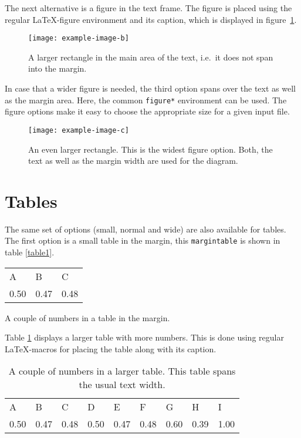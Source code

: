\documentclass{caesar_book}
\begin{document}
The next alternative is a figure in the text frame. The figure is placed using the regular \LaTeX-figure environment and its  caption, which is displayed in figure~\ref{rectangle2}. 
%
\begin{figure}[htbp]%
	\texttt{[image: example-image-b]}%
	\caption{A larger rectangle in the main area of the text, i.e.\ it does not span into the margin.}%
	\label{rectangle2}%
\end{figure}%
%

In case that a wider figure is needed, the third option spans over the text as well as the margin area. Here, the common \texttt{figure*} environment can be used. The figure options make it easy to choose the appropriate size for a given input file. 
%
\begin{figure*}[htbp]
    \texttt{[image: example-image-c]}%
    \caption{An even larger rectangle. This is the widest figure option. Both, the text as well as the margin width are used for the diagram.}
    \label{rectangle3}
\end{figure*}
%

\section{Tables}
The same set of options (small, normal and wide) are also available for tables. The first option is a small table in the margin, this \texttt{margintable} is shown in table \ref{table1}.
%
\begin{margintable}%
	\begin{tabular}{lll}%
     A&B&C\\%
     0.50&0.47&0.48\\%
    \end{tabular}%
	\vspace{2pt}
	\caption{A couple of numbers in a table in the margin.\label{table1}}%
\end{margintable}%

Table \ref{table2} displays a larger table with more numbers. This is done using regular \LaTeX-macros for placing the table along with its caption. 
%
\begin{table}[htbp]%
	 \begin{tabular}{lllllllll}%
     A&B&C&D&E&F&G&H&I\\%
    0.50&0.47&0.48&0.50&0.47&0.48&0.60&0.39&1.00\\%
    \end{tabular}%
	\vspace{2pt}%
	\captionsetup{width=\textwidth, justification=justified}%
	\caption{A couple of numbers in a larger table. This table spans the usual text width.\label{table2}}%
\end{table}%
\end{document}
